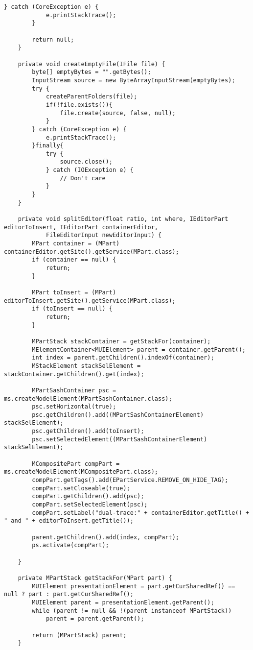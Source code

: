 \begin{lstlisting}[caption= code in OpenDualEditorsHandler.java]
		} catch (CoreException e) {
			e.printStackTrace();
		}

		return null;
	}

    private void createEmptyFile(IFile file) {
		byte[] emptyBytes = "".getBytes();
		InputStream source = new ByteArrayInputStream(emptyBytes);
		try {
			createParentFolders(file);
			if(!file.exists()){
				file.create(source, false, null);
			}
		} catch (CoreException e) {
			e.printStackTrace();
		}finally{
			try {
				source.close();
			} catch (IOException e) {
				// Don't care
			}
		}
	}

	private void splitEditor(float ratio, int where, IEditorPart editorToInsert, IEditorPart containerEditor,
			FileEditorInput newEditorInput) {
		MPart container = (MPart) containerEditor.getSite().getService(MPart.class);
		if (container == null) {
			return;
		}

		MPart toInsert = (MPart) editorToInsert.getSite().getService(MPart.class);
		if (toInsert == null) {
			return;
		}

		MPartStack stackContainer = getStackFor(container);
		MElementContainer<MUIElement> parent = container.getParent();
		int index = parent.getChildren().indexOf(container);
		MStackElement stackSelElement = stackContainer.getChildren().get(index);

		MPartSashContainer psc = ms.createModelElement(MPartSashContainer.class);
		psc.setHorizontal(true);
		psc.getChildren().add((MPartSashContainerElement) stackSelElement);
		psc.getChildren().add(toInsert);
		psc.setSelectedElement((MPartSashContainerElement) stackSelElement);

		MCompositePart compPart = ms.createModelElement(MCompositePart.class);
		compPart.getTags().add(EPartService.REMOVE_ON_HIDE_TAG);
		compPart.setCloseable(true);
		compPart.getChildren().add(psc);
		compPart.setSelectedElement(psc);
		compPart.setLabel("dual-trace:" + containerEditor.getTitle() + " and " + editorToInsert.getTitle());

		parent.getChildren().add(index, compPart);
		ps.activate(compPart);

	}

	private MPartStack getStackFor(MPart part) {
		MUIElement presentationElement = part.getCurSharedRef() == null ? part : part.getCurSharedRef();
		MUIElement parent = presentationElement.getParent();
		while (parent != null && !(parent instanceof MPartStack))
			parent = parent.getParent();

		return (MPartStack) parent;
	}



\end{lstlisting}
